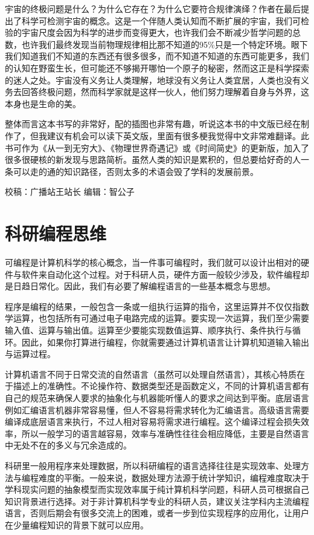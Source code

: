 \documentclass[]{book}
\begin{document}
宇宙的终极问题是什么？为什么它存在？为什么它要符合规律演绎？作者在最后提出了科学可检测宇宙的概念。这是一个伴随人类认知而不断扩展的宇宙，我们可检验的宇宙尺度会因为科学的进步而变得更大，也许我们会不断减少哲学问题的总数，也许我们最终发现当前物理规律相比那不知道的95\%只是一个特定环境。眼下我们知道我们不知道的东西还有很多很多，而不知道不知道的东西可能更多，我们的认知在野蛮生长，但可能还不够揭开哪怕一个原子的秘密，然而这正是科学探索的迷人之处。宇宙没有义务让人类理解，地球没有义务让人类宜居，人类也没有义务去回答终极问题，然而科学家就是这样一伙人，他们努力理解着自身与外界，这本身也是生命的美。

整体而言这本书写的非常好，配的插图也非常有趣，听说这本书的中文版已经在制作了，但我建议有机会可以读下英文版，里面有很多梗我觉得中文非常难翻译。此书可作为《从一到无穷大》、《物理世界奇遇记》或《时间简史》的更新版，加入了很多很硬核的新发现与思路简析。虽然人类的知识是累积的，但总要给好奇的人一条可以走的通的知识路径，否则太多的术语会毁了学科的发展前景。

校稿：广播站王站长
编辑：智公子

\hypertarget{ux79d1ux7814ux7f16ux7a0bux601dux7ef4}{%
\section{科研编程思维}\label{ux79d1ux7814ux7f16ux7a0bux601dux7ef4}}

可编程是计算机科学的核心概念，当一件事可编程时，我们就可以设计出相对的硬件与软件来自动化这个过程。对于科研人员，硬件方面一般较少涉及，软件编程却是日趋日常化。因此，我们有必要了解编程语言的一些基本概念与思想。

程序是编程的结果，一般包含一条或一组执行运算的指令，这里运算并不仅仅指数学运算，也包括所有可通过电子电路完成的运算。要实现一次运算，我们至少需要输入值、运算与输出值。运算至少要能实现数值运算、顺序执行、条件执行与循环。因此，如果你打算进行编程，你就需要通过计算机语言让计算机知道输入输出与运算过程。

计算机语言不同于日常交流的自然语言（虽然可以处理自然语言），其核心特质在于描述上的准确性。不论操作符、数据类型还是函数定义，不同的计算机语言都有自己的规范来确保人要求的抽象化与机器能听懂人的要求之间达到平衡。底层语言例如汇编语言机器非常容易懂，但人不容易将需求转化为汇编语言。高级语言需要编译成底层语言来执行，不过人相对容易将需求进行编程。这个编译过程会损失效率，所以一般学习的语言越容易，效率与准确性往往会相应降低，主要是自然语言中无处不在的多义与冗余造成的。

科研里一般用程序来处理数据，所以科研编程的语言选择往往是实现效率、处理方法与编程难度的平衡。一般来说，数据处理方法源于统计学知识，编程难度取决于学科现实问题的抽象模型而实现效率属于纯计算机科学问题，科研人员可根据自己知识背景进行选择。对于非计算机科学专业的科研人员，建议关注学科内主流编程语言，否则后期会有很多交流上的困难，或者一步到位实现程序的应用化，让用户在少量编程知识的背景下就可以应用。
\end{document}
